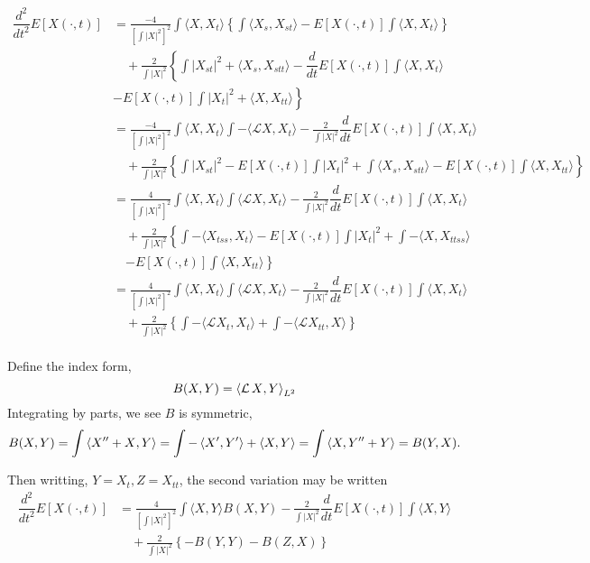 \documentclass[12pt]{article}
\begin{document}
\begin{align*}
\dfrac{d^2}{dt^2}E[X(\cdot,t)] &= \frac{-4}{\left[\int|X|^2\right]^2}    \int \langle X,X_t\rangle \left\lbrace \int \langle X_s,X_{st}\rangle - E[X(\cdot,t)] \int\langle X,X_t\rangle \right\rbrace \\
&\quad +\frac2{\int|X|^2} \left\lbrace   \int  |X_{st}|^2 +\langle X_{s},X_{stt}\rangle - \dfrac{d}{dt}E[X(\cdot,t)]  \int\langle X,X_t\rangle \right. \\
& \left.  - E[X(\cdot,t)] \int |X_t|^2 +\langle X,X_{tt}\rangle \right\rbrace \\
&= \frac{-4}{\left[\int|X|^2\right]^2} \int \langle X,X_t\rangle \int -\langle \mathcal{L}X,X_t\rangle   - \frac2{\int|X|^2} \dfrac{d}{dt}E[X(\cdot,t)]  \int\langle X,X_t\rangle \\
&\quad +\frac2{\int|X|^2} \left\lbrace   \int  |X_{st}|^2 - E[X(\cdot,t)] \int |X_t|^2 +\int \langle X_{s},X_{stt}\rangle - E[X(\cdot,t)] \int \langle X,X_{tt}\rangle \right\rbrace \\
&= \frac{4}{\left[\int|X|^2\right]^2} \int \langle X,X_t\rangle \int   \langle \mathcal{L}X,X_t\rangle - \frac2{\int|X|^2} \dfrac{d}{dt}E[X(\cdot,t)]  \int\langle X,X_t\rangle \\
&\quad+ \frac2{\int|X|^2} \left\lbrace \int-\langle X_{tss},X_t\rangle  - E[X(\cdot,t)] \int |X_t|^2 +\int - \langle X,X_{ttss}\rangle \right. \\
&\quad \left. - E[X(\cdot,t)] \int \langle X,X_{tt}\rangle \right\rbrace \\
&= \frac{4}{\left[\int|X|^2\right]^2} \int \langle X,X_t\rangle \int \langle \mathcal{L}X,X_t\rangle - \frac2{\int|X|^2} \dfrac{d}{dt}E[X(\cdot,t)]  \int\langle X,X_t\rangle \\
&\quad + \frac2{\int|X|^2} \left\lbrace   \int  -\langle \mathcal{L}X_{t},X_t\rangle   +\int -  \langle \mathcal{L}X_{tt},X \rangle\right\rbrace \\
\end{align*}

Define the index form,
\[
B(X, Y) = \left\langle{\operatorname{\mathcal{L}}X},{Y}\right\rangle_{L^2}
\]
Integrating by parts, we see \(B\) is symmetric,
\[
B(X, Y) = \int \left\langle{X'' + X},{Y}\right\rangle = \int-\left\langle{X'},{Y'}\right\rangle + \left\langle{X},{Y}\right\rangle = \int \left\langle{X},{Y'' + Y}\right\rangle = B(Y, X).
\]

Then writting, \(Y = X_t, Z = X_{tt}\), the second variation may be written
\begin{align*}
\dfrac{d^2}{dt^2}E[X(\cdot,t)] &= \frac{4}{\left[\int|X|^2\right]^2} \int \langle X,Y\rangle B(X, Y) - \frac2{\int|X|^2} \dfrac{d}{dt}E[X(\cdot,t)]  \int\langle X,Y\rangle \\
&\quad + \frac2{\int|X|^2} \left\lbrace -B(Y, Y) - B(Z, X) \right\rbrace \\
\end{align*}
\end{document}
